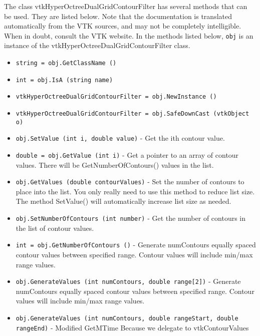 The class vtkHyperOctreeDualGridContourFilter has several methods that can be used.
  They are listed below.
Note that the documentation is translated automatically from the VTK sources,
and may not be completely intelligible.  When in doubt, consult the VTK website.
In the methods listed below, \verb|obj| is an instance of the vtkHyperOctreeDualGridContourFilter class.
\begin{itemize}
\item  \verb|string = obj.GetClassName ()|

\item  \verb|int = obj.IsA (string name)|

\item  \verb|vtkHyperOctreeDualGridContourFilter = obj.NewInstance ()|

\item  \verb|vtkHyperOctreeDualGridContourFilter = obj.SafeDownCast (vtkObject o)|

\item  \verb|obj.SetValue (int i, double value)| -  Get the ith contour value.

\item  \verb|double = obj.GetValue (int i)| -  Get a pointer to an array of contour values. There will be
 GetNumberOfContours() values in the list.

\item  \verb|obj.GetValues (double contourValues)| -  Set the number of contours to place into the list. You only really
 need to use this method to reduce list size. The method SetValue()
 will automatically increase list size as needed.

\item  \verb|obj.SetNumberOfContours (int number)| -  Get the number of contours in the list of contour values.

\item  \verb|int = obj.GetNumberOfContours ()| -  Generate numContours equally spaced contour values between specified
 range. Contour values will include min/max range values.

\item  \verb|obj.GenerateValues (int numContours, double range[2])| -  Generate numContours equally spaced contour values between specified
 range. Contour values will include min/max range values.

\item  \verb|obj.GenerateValues (int numContours, double rangeStart, double rangeEnd)| -  Modified GetMTime Because we delegate to vtkContourValues


\end{itemize}
